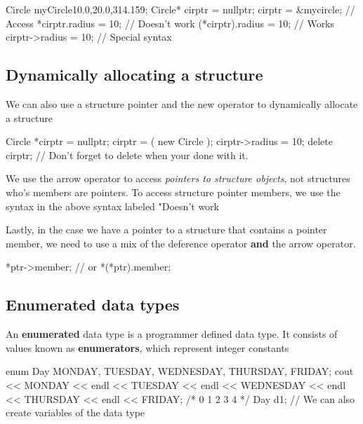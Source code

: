 \documentclass{report}
\begin{document}
	\begin{cppcode}
Circle myCircle{10.0,20.0,314.159};
Circle* cirptr = nullptr;
cirptr = &mycircle;
// Access
*cirptr.radius = 10; // Doesn't work
(*cirptr).radius = 10; // Works
cirptr->radius = 10; // Special syntax
	\end{cppcode}
	
	\bigbreak \noindent 

	\bigbreak \noindent 
	\subsection{Dynamically allocating a structure}
	\bigbreak \noindent 
	We can also use a structure pointer and the new operator to dynamically allocate a structure
	\bigbreak \noindent 
	
	\begin{cppcode}
Circle *cirptr = nullptr;
cirptr = ( new Circle );
cirptr->radius = 10;
delete cirptr; // Don't forget to delete when your done with it.
	\end{cppcode}
	
	\bigbreak \noindent 
	\begin{notebox}
	    We use the arrow operator to access \textit{pointers to structure objects}, not structures who's members are pointers. To access structure pointer members, we use the syntax in the above syntax labeled "Doesn't work
	\end{notebox}
	
	\bigbreak \noindent 
	Lastly, in the case we have a pointer to a structure that contains a pointer member, we need to use a mix of the deference operator \textbf{and} the arrow operator. 
	\bigbreak \noindent 
	
	\begin{cppcode}
*ptr->member;
// or
*(*ptr).member;
	\end{cppcode}
	

	\pagebreak \bigbreak \noindent 
	\subsection{Enumerated data types}
	\bigbreak \noindent 
	\begin{concept}
	   An \textbf{enumerated} data type is a programmer defined data type. It consists of values known as \textbf{enumerators}, which represent integer constants 
	\end{concept}
	\bigbreak \noindent 
	
	\begin{cppcode}
enum Day { MONDAY, TUESDAY, WEDNESDAY, THURSDAY, FRIDAY};
cout << MONDAY << endl 
    << TUESDAY << endl 
    << WEDNESDAY << endl 
    << THURSDAY << endl 
    << FRIDAY;
/*
0
1
2
3
4
*/
Day d1; //	We can also create variables of the data type
	\end{cppcode}
	
\end{document}
